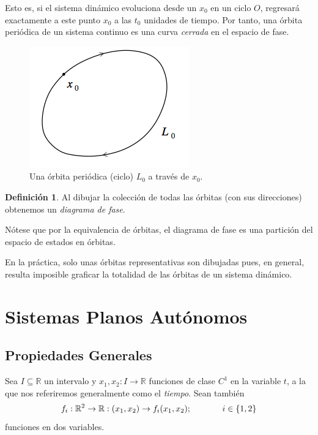 \documentclass[11pt]{book}
\theoremstyle{definition}
\newtheorem{definition}{Definición}
\numberwithin{definition}{section}
\theoremstyle{theorem}
\numberwithin{theorem}{section}
\numberwithin{lemma}{section}
\numberwithin{corollary}{section}
\theoremstyle{plain}
\numberwithin{example}{section}
\newcommand{\R}{{\ensuremath{\mathbb{R}}}}
\begin{document}
Esto es, si el sistema din\'amico evoluciona desde un $x_0$ en un ciclo $O$,
regresar\'a exactamente a este punto $x_0$ a las $t_0$ unidades de tiempo. Por
tanto, una \'orbita peri\'odica de un sistema continuo es una curva
{\emph{cerrada}} en el espacio de fase.

\begin{figure} \label{fig:cycle} \centering
    \includegraphics[scale=0.5]{figures/orbit-cycle.png}
    \caption{Una órbita periódica (ciclo) $L_0$ a través de $x_0$.}
\end{figure}

\begin{definition}
  \label{def:phasediagram}Al dibujar la colecci\'on de todas las \'orbitas
  (con sus direcciones) obtenemos un {\emph{diagrama de fase}}.
\end{definition}

N\'otese que por la equivalencia de \'orbitas, el diagrama de fase es una
partici\'on del espacio de estados en \'orbitas.

En la pr\'actica, solo unas \'orbitas representativas son dibujadas pues, en general,
resulta imposible graficar la totalidad de las \'orbitas de un sistema din\'amico.

\chapter{Sistemas Planos Autónomos}
\label{cap:sistemasplanosautonomos}

\section{Propiedades Generales}
\label{sec:propiedades_generales}

Sea $I \subseteq \R$ un intervalo y $x_1,x_2:I \rightarrow \R$ funciones de clase $C^1$ en la variable $t$, a la que nos referiremos generalmente como el \textit{tiempo}.
Sean también $$f_i : \R^2 \rightarrow \R: (x_1, x_2) \rightarrow f_i(x_1, x_2); \hspace{0.5in} i \in \{1,2\}$$ funciones en dos variables.
\end{document}
